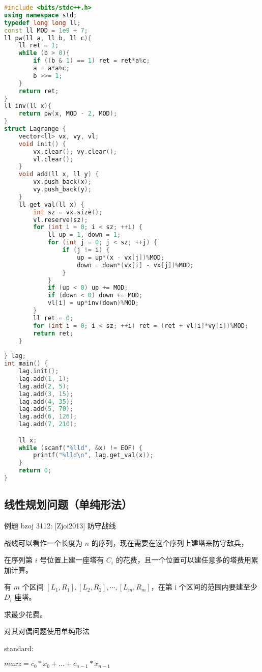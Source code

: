 \begin{lstlisting}[language=C++]
#include <bits/stdc++.h>
using namespace std;
typedef long long ll;
const ll MOD = 1e9 + 7;
ll pw(ll a, ll b, ll c){
    ll ret = 1;
    while (b > 0){
        if ((b & 1) == 1) ret = ret*a%c;
        a = a*a%c;
        b >>= 1;
    }
    return ret;
}
ll inv(ll x){
    return pw(x, MOD - 2, MOD);
}
struct Lagrange {
    vector<ll> vx, vy, vl;
    void init() {
        vx.clear(); vy.clear();
        vl.clear();
    }
    void add(ll x, ll y) {
        vx.push_back(x);
        vy.push_back(y);
    }
    ll get_val(ll x) {
        int sz = vx.size();
        vl.reserve(sz);
        for (int i = 0; i < sz; ++i) {
            ll up = 1, down = 1;
            for (int j = 0; j < sz; ++j) {
                if (j != i) {
                    up = up*(x - vx[j])%MOD;
                    down = down*(vx[i] - vx[j])%MOD;
                }
            }  
            if (up < 0) up += MOD;
            if (down < 0) down += MOD;
            vl[i] = up*inv(down)%MOD;
        }
        ll ret = 0;
        for (int i = 0; i < sz; ++i) ret = (ret + vl[i]*vy[i])%MOD;
        return ret;
    }
    
} lag;
int main() {
    lag.init();
    lag.add(1, 1);
    lag.add(2, 5);
    lag.add(3, 15);
    lag.add(4, 35);
    lag.add(5, 70);
    lag.add(6, 126);
    lag.add(7, 210);

    ll x;
    while (scanf("%lld", &x) != EOF) {
        printf("%lld\n", lag.get_val(x));
    }
    return 0;  
}
\end{lstlisting}

\subsection{线性规划问题（单纯形法）}

例题 bzoj 3112: [Zjoi2013] 防守战线

战线可以看作一个长度为 $n$ 的序列，现在需要在这个序列上建塔来防守敌兵，

在序列第 $i$ 号位置上建一座塔有 $C_i$ 的花费，且一个位置可以建任意多的塔费用累加计算。

有 $m$ 个区间 $[L_1, R_1], [L_2, R_2], \cdots , [L_m, R_m]$，在第 i 个区间的范围内要建至少 $D_i$ 座塔。

求最少花费。

对其对偶问题使用单纯形法

standard:

$max z = c_0*x_0 + ... + c_{n - 1}*x_{n - 1}$


